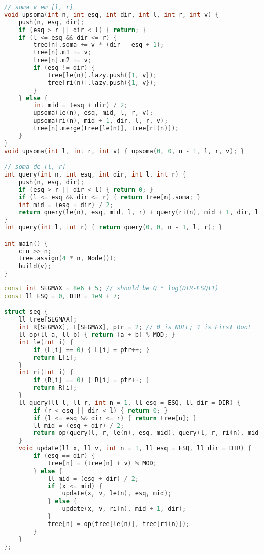 \documentclass[11pt, a4paper, twoside]{book}
\begin{document}
\begin{lstlisting}[language=C++]
// soma v em [l, r]
void upsoma(int n, int esq, int dir, int l, int r, int v) {
    push(n, esq, dir);
    if (esq > r || dir < l) { return; }
    if (l <= esq && dir <= r) {
        tree[n].soma += v * (dir - esq + 1);
        tree[n].m1 += v;
        tree[n].m2 += v;
        if (esq != dir) {
            tree[le(n)].lazy.push({1, v});
            tree[ri(n)].lazy.push({1, v});
        }
    } else {
        int mid = (esq + dir) / 2;
        upsoma(le(n), esq, mid, l, r, v);
        upsoma(ri(n), mid + 1, dir, l, r, v);
        tree[n].merge(tree[le(n)], tree[ri(n)]);
    }
}
void upsoma(int l, int r, int v) { upsoma(0, 0, n - 1, l, r, v); }

// soma de [l, r]
int query(int n, int esq, int dir, int l, int r) {
    push(n, esq, dir);
    if (esq > r || dir < l) { return 0; }
    if (l <= esq && dir <= r) { return tree[n].soma; }
    int mid = (esq + dir) / 2;
    return query(le(n), esq, mid, l, r) + query(ri(n), mid + 1, dir, l, r);
}
int query(int l, int r) { return query(0, 0, n - 1, l, r); }

int main() {
    cin >> n;
    tree.assign(4 * n, Node());
    build(v);
}
\end{lstlisting}

\hfill

\begin{lstlisting}[language=C++]
const int SEGMAX = 8e6 + 5; // should be Q * log(DIR-ESQ+1)
const ll ESQ = 0, DIR = 1e9 + 7;

struct seg {
    ll tree[SEGMAX];
    int R[SEGMAX], L[SEGMAX], ptr = 2; // 0 is NULL; 1 is First Root
    ll op(ll a, ll b) { return (a + b) % MOD; }
    int le(int i) {
        if (L[i] == 0) { L[i] = ptr++; }
        return L[i];
    }
    int ri(int i) {
        if (R[i] == 0) { R[i] = ptr++; }
        return R[i];
    }
    ll query(ll l, ll r, int n = 1, ll esq = ESQ, ll dir = DIR) {
        if (r < esq || dir < l) { return 0; }
        if (l <= esq && dir <= r) { return tree[n]; }
        ll mid = (esq + dir) / 2;
        return op(query(l, r, le(n), esq, mid), query(l, r, ri(n), mid + 1, dir));
    }
    void update(ll x, ll v, int n = 1, ll esq = ESQ, ll dir = DIR) {
        if (esq == dir) {
            tree[n] = (tree[n] + v) % MOD;
        } else {
            ll mid = (esq + dir) / 2;
            if (x <= mid) {
                update(x, v, le(n), esq, mid);
            } else {
                update(x, v, ri(n), mid + 1, dir);
            }
            tree[n] = op(tree[le(n)], tree[ri(n)]);
        }
    }
};
\end{lstlisting}
\end{document}
